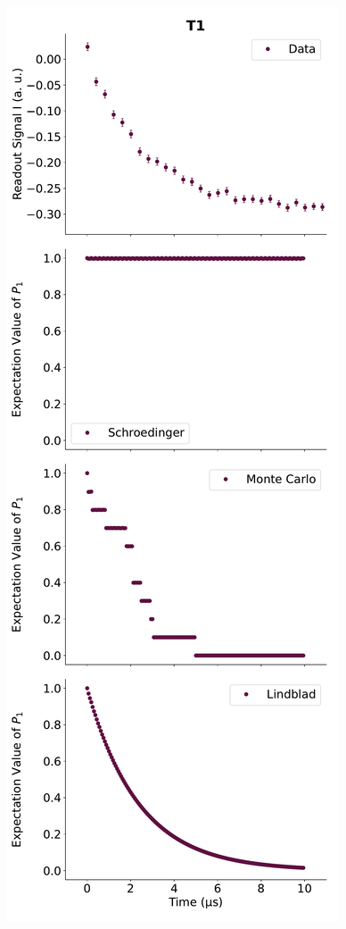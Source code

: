 \begin{figure}[h]
    \begin{minipage}{0.50\textwidth}
        \centering
        \includegraphics[]{Simulations/simulations_of_calibrations/Figs/qubit_T1.pdf}

\end{minipage}
\end{figure}
